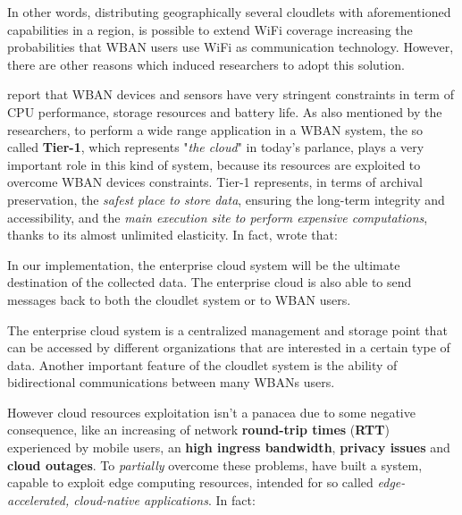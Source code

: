 \documentclass[sigchi]{acmart}
\begin{document}
\vspace{0.3cm}

In other words, distributing geographically several cloudlets with aforementioned capabilities in a region, is possible to extend WiFi coverage increasing the probabilities that WBAN users use WiFi as communication technology. However, there are other reasons which induced researchers to adopt this solution. 

\citet{MSAReport} report that WBAN devices and sensors have very stringent constraints in term of CPU performance, storage resources and battery life. As also mentioned by the researchers, to perform a wide range application in a WBAN system, the so called \textbf{Tier-1}, which represents "\textit{the cloud}" in today's parlance, plays a very important role in this kind of system, because its resources are exploited to overcome WBAN devices constraints. Tier-1 represents, in terms of archival preservation, the \textit{safest place to store data}, ensuring the long-term integrity and accessibility, and the \textit{main execution site to perform expensive computations}, thanks to its almost unlimited elasticity. In fact, \citet{MSAReport} wrote that:

\vspace{0.3cm}

\begin{quoting}[font=itshape, begintext={``}, endtext={''\cite[par.~3.2]{MSAReport}}]
In our implementation, the enterprise cloud system will be the ultimate destination of the collected data. The enterprise cloud is also able to send messages back to both the cloudlet system or to WBAN users.
\end{quoting}

\vspace{0.3cm}

\begin{quoting}[font=itshape, begintext={``}, endtext={''\cite[par.~4.1]{MSAReport}}]
The enterprise cloud system is a centralized management and storage point that can be accessed by different organizations that are interested in a certain type of data. Another important feature of the cloudlet system is the ability of bidirectional communications between many WBANs users.
\end{quoting}

\vspace{0.3cm}

However cloud resources exploitation isn't a panacea due to some negative consequence, like an increasing of network \textbf{round-trip times} (\textbf{RTT}) experienced by mobile users, an \textbf{high ingress bandwidth}, \textbf{privacy issues} and \textbf{cloud outages}. To \textit{partially} overcome these problems, \citet{MSAReport} have built a system, capable to exploit edge computing resources, intended for so called \textit{edge-accelerated, cloud-native applications}. \cite{TheSeminalRoleEdgeNativeApplications}\cite{TheEmergenceOfEdgeComputing} In fact:
\end{document}
